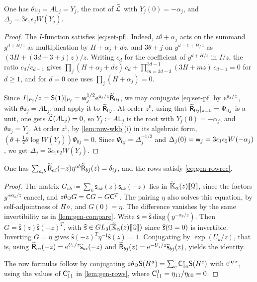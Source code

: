 \begin{lem}
\label{lem:gen-Y}
One has $\theta\mathsf{u}_j=A\mathsf{L}_j=Y_j$, the root of $\widehat{\mathcal{L}}$ with $Y_j(0)=-\alpha_j$, and $\Delta_j=3\epsilon_1\epsilon_2W(Y_j)$.
\end{lem}
\begin{proof}
The $I$-function satisfies \cref{eq:set-pf}. Indeed, $z\theta+\alpha_j$ acts on the summand $y^{d+H/z}$ as multiplication by $H+\alpha_j+dz$, and $3\theta+j$ on $y^{d-1+H/z}$ as $(3H+(3d-3+j)z)/z$. Writing $c_d$ for the coefficient of $y^{d+H/z}$ in $I/z$, the ratio $c_d/c_{d-1}$ gives $\prod_j(H+\alpha_j+dz)\,c_d+\prod_{m=3d-3}^{3d-1}(3H+mz)\,c_{d-1}=0$ for $d\geq1$, and for $d=0$ one uses $\prod_j(H+\alpha_j)=0$.

Since $I|_{P_j}/z=\mathsf{S}(\mathbf{1})|_{P_j}=\mathsf{w}_j^{1/2}\mathrm{e}^{\mathsf{u}_j/z}\widetilde{\mathsf{R}}_{0j}$, we may conjugate \cref{eq:set-pf} by $\mathrm{e}^{\mathsf{u}_j/z}$, with $\theta\mathsf{u}_j=A\mathsf{L}_j$, and apply it to $\widetilde{\mathsf{R}}_{0j}$. At order $z^0$, using that $\widetilde{\mathsf{R}}_{0j}|_{z=0}=\Psi_{0j}$ is a unit, one gets $\widehat{\mathcal{L}}(A\mathsf{L}_j)=0$, so $Y_j\coloneqq A\mathsf{L}_j$ is the root with $Y_j(0)=-\alpha_j$, and $\theta\mathsf{u}_j=Y_j$. At order $z^1$, by \cref{lem:row-wkb}(i) in its algebraic form, $(\theta+\frac12\theta\log W(Y_j))\Psi_{0j}=0$. Since $\Psi_{0j}=\Delta_j^{-1/2}$ and $\Delta_j(0)=\mathsf{w}_j=3\epsilon_1\epsilon_2W(-\alpha_j)$, we get $\Delta_j=3\epsilon_1\epsilon_2W(Y_j)$.
\end{proof}

\begin{lem}[Unitarity]
\label{lem:gen-unit}
One has $\sum_{a,b}\widetilde{\mathsf{R}}_{ai}(-z)\eta^{ab}\widetilde{\mathsf{R}}_{bj}(z)=\delta_{ij}$, and the rows satisfy \cref{eq:gen-rowrec}.
\end{lem}
\begin{proof}
The matrix $G_{ab}\coloneqq\sum_k\mathsf{s}_{ak}(z)\mathsf{s}_{bk}(-z)$ lies in $\widetilde{\mathbb{K}}_{\alpha}(z)[\![ \mathcal{Q} ]\!]$, since the factors $y^{\pm\alpha_k/z}$ cancel, and $z\theta_{\mathcal{Q}} G=\mathsf{C} G-G\mathsf{C}^T$. The pairing $\eta$ also solves this equation, by self-adjointness of $H\circ$, and $G(0)=\eta$. The difference vanishes by the same invertibility as in \cref{lem:gen-compare}. Write $\mathsf{s}=\widehat{\mathsf{s}}\,\mathrm{diag}(y^{-\alpha_k/z})$. Then $G=\widehat{\mathsf{s}}(z)\widehat{\mathsf{s}}(-z)^T$, with $\widehat{\mathsf{s}}\in GL_3(\widetilde{\mathbb{K}}_{\alpha}(z)[\![ \mathcal{Q} ]\!])$ since $\widehat{\mathsf{s}}(\mathcal{Q}=0)$ is invertible. Inverting $G=\eta$ gives $\widehat{\mathsf{s}}(-z)^T\eta^{-1}\widehat{\mathsf{s}}(z)=1$. Conjugating by $\exp(U_k/z)$, that is, using $\widetilde{\mathsf{R}}_{ai}(-z)=\mathrm{e}^{U_i/z}\widehat{\mathsf{s}}_{ai}(-z)$ and $\widetilde{\mathsf{R}}_{bj}(z)=\mathrm{e}^{-U_j/z}\widehat{\mathsf{s}}_{bj}(z)$, yields the identity.

The row formulas follow by conjugating $z\theta_{\mathcal{Q}}\mathsf{S}(H^a)=\sum_c\mathsf{C}^c_{1a}\mathsf{S}(H^c)$ with $\mathrm{e}^{\mathsf{u}/z}$, using the values of $\mathsf{C}^c_{11}$ in \cref{lem:gen-rows}, where $\mathsf{C}^0_{11}=\eta_{11}/\eta_{00}=0$. 
\end{proof}

